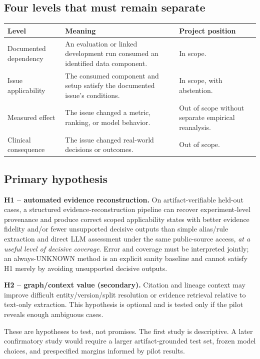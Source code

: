 \documentclass[11pt,a4paper]{article}
\newcommand{\status}[1]{\textsf{\small #1}}
\begin{document}
\subsection{Four levels that must remain separate}
\begin{tabularx}{\linewidth}{@{}L{32mm}Y L{30mm}@{}}
\toprule
\textbf{Level} & \textbf{Meaning} & \textbf{Project position}\\ \midrule
Documented dependency & An evaluation or linked development run consumed an identified data component. & In scope.\\
Issue applicability & The consumed component and setup satisfy the documented issue's conditions. & In scope, with abstention.\\
Measured effect & The issue changed a metric, ranking, or model behavior. & Out of scope without separate empirical reanalysis.\\
Clinical consequence & The issue changed real-world decisions or outcomes. & Out of scope.\\
\bottomrule
\end{tabularx}

\subsection{Primary hypothesis}
\textbf{H1 -- automated evidence reconstruction.} On artifact-verifiable held-out cases, a structured evidence-reconstruction pipeline can recover experiment-level provenance and produce correct scoped applicability states with better evidence fidelity and/or fewer unsupported decisive outputs than simple alias/rule extraction and direct LLM assessment under the same public-source access, \emph{at a useful level of decisive coverage}. Error and coverage must be interpreted jointly; an always-\status{UNKNOWN} method is an explicit sanity baseline and cannot satisfy H1 merely by avoiding unsupported decisive outputs.

\textbf{H2 -- graph/context value (secondary).} Citation and lineage context may improve difficult entity/version/split resolution or evidence retrieval relative to text-only extraction. This hypothesis is optional and is tested only if the pilot reveals enough ambiguous cases.

These are hypotheses to test, not promises. The first study is descriptive. A later confirmatory study would require a larger artifact-grounded test set, frozen model choices, and prespecified margins informed by pilot results.
\end{document}
